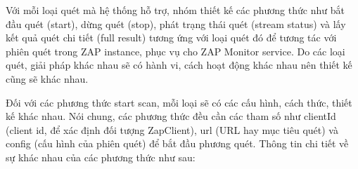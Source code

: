 Với mỗi loại quét mà hệ thống hỗ trợ, nhóm thiết kế các phương thức như bắt đầu quét (start), dừng quét (stop), phát trạng thái quét (stream status) và lấy kết quả quét chi tiết (full result) tương ứng với loại quét đó để tương tác với phiên quét trong ZAP instance, phục vụ cho ZAP Monitor service. Do các loại quét, giải pháp khác nhau sẽ có hành vi, cách hoạt động khác nhau nên thiết kế cũng sẽ khác nhau.
\par

Đối với các phương thức start scan, mỗi loại sẽ có các cấu hình, cách thức, thiết kế khác nhau. Nói chung, các phương thức đều cần các tham số như clientId (client id, để xác định đối tượng ZapClient), url (URL hay mục tiêu quét) và config (cấu hình của phiên quét) để bắt đầu phương quét. Thông tin chi tiết về sự khác nhau của các phương thức như sau:
\par

